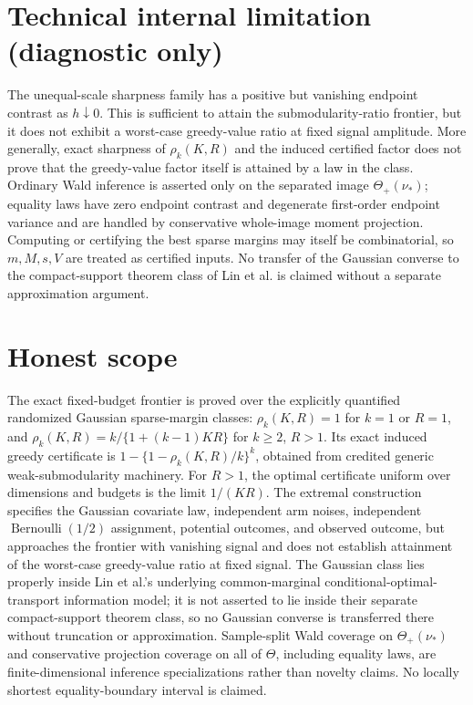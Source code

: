 \documentclass{article}
\begin{document}
\section*{Technical internal limitation (diagnostic only)}

The unequal-scale sharpness family has a positive but vanishing endpoint contrast as \(h\downarrow0\). This is sufficient to attain the submodularity-ratio frontier, but it does not exhibit a worst-case greedy-value ratio at fixed signal amplitude. More generally, exact sharpness of \(\rho_k(K,R)\) and the induced certified factor does not prove that the greedy-value factor itself is attained by a law in the class. Ordinary Wald inference is asserted only on the separated image \(\Theta_+(\nu_*)\); equality laws have zero endpoint contrast and degenerate first-order endpoint variance and are handled by conservative whole-image moment projection. Computing or certifying the best sparse margins may itself be combinatorial, so \(m,M,s,V\) are treated as certified inputs. No transfer of the Gaussian converse to the compact-support theorem class of Lin et al. is claimed without a separate approximation argument.

\section{Honest scope}

The exact fixed-budget frontier is proved over the explicitly quantified randomized Gaussian sparse-margin classes: \(\rho_k(K,R)=1\) for \(k=1\) or \(R=1\), and \(\rho_k(K,R)=k/\{1+(k-1)KR\}\) for \(k\ge2\), \(R>1\). Its exact induced greedy certificate is \(1-\{1-\rho_k(K,R)/k\}^k\), obtained from credited generic weak-submodularity machinery. For \(R>1\), the optimal certificate uniform over dimensions and budgets is the limit \(1/(KR)\). The extremal construction specifies the Gaussian covariate law, independent arm noises, independent \(\operatorname{Bernoulli}(1/2)\) assignment, potential outcomes, and observed outcome, but approaches the frontier with vanishing signal and does not establish attainment of the worst-case greedy-value ratio at fixed signal. The Gaussian class lies properly inside Lin et al.'s underlying common-marginal conditional-optimal-transport information model; it is not asserted to lie inside their separate compact-support theorem class, so no Gaussian converse is transferred there without truncation or approximation. Sample-split Wald coverage on \(\Theta_+(\nu_*)\) and conservative projection coverage on all of \(\Theta\), including equality laws, are finite-dimensional inference specializations rather than novelty claims. No locally shortest equality-boundary interval is claimed.
\end{document}
